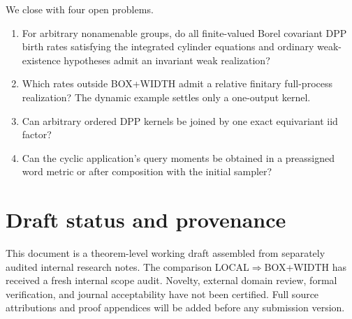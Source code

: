 \documentclass[11pt]{article}
\theoremstyle{definition}
\theoremstyle{remark}
\newcommand{\1}{\mathbf{1}}
\begin{document}
We close with four open problems.
\begin{enumerate}[label=(\arabic*)]
\item For arbitrary nonamenable groups, do all finite-valued Borel covariant
  DPP birth rates satisfying the integrated cylinder equations and ordinary
  weak-existence hypotheses admit an invariant weak realization?
\item Which rates outside BOX+WIDTH admit a relative finitary full-process
  realization?  The dynamic example settles only a one-output kernel.
\item Can arbitrary ordered DPP kernels be joined by one exact equivariant iid
  factor?
\item Can the cyclic application's query moments be obtained in a preassigned
  word metric or after composition with the initial sampler?
\end{enumerate}

\section*{Draft status and provenance}

This document is a theorem-level working draft assembled from separately
audited internal research notes.  The comparison LOCAL$\Rightarrow$BOX+WIDTH
has received a fresh internal scope audit.  Novelty, external domain review,
formal verification, and journal acceptability have not been certified.
Full source attributions and proof appendices will be added before any
submission version.
\end{document}
